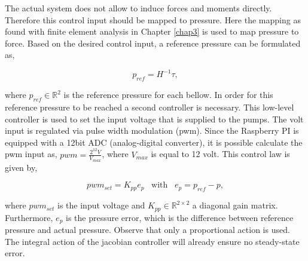 The actual system does not allow to induce forces and moments directly. Therefore this control input should be mapped to pressure. Here the mapping as found with finite element analysis in Chapter \ref{chap3} is used to map pressure to force. Based on the desired control input, a reference pressure can be formulated as,

\begin{equation}
    p_{ref} = H^{-1}\tau,
\end{equation}


where $p_{ref} \in \mathbb{R}^2$ is the reference pressure for each bellow. In order for this reference pressure to be reached a second controller is necessary. This low-level controller is used to set the input voltage that is supplied to the pumps.  The volt input is regulated via pulse width modulation (pwm). Since the Raspberry PI is equipped with a 12bit ADC (analog-digital converter), it is possible calculate the pwm input as, $\textit{pwm} = \frac{2^{12} V}{V_{max}} $, where $V_{max}$ is equal to 12 volt. This control law is given by,


\begin{equation}
    pwm_{set} = K_{pp}e_p \hspace{10pt} \text{with} \hspace{10pt} e_p = p_{ref} - p,
\end{equation}



where $pwm_{set}$ is the input voltage and $K_{pp} \in \mathbb{R}^{2\times 2}$ a diagonal gain matrix. Furthermore, $e_p$ is the pressure error, which is the difference between reference pressure and actual pressure. Observe that only a proportional action is used. The integral action of the jacobian controller will already ensure no steady-state error. 











